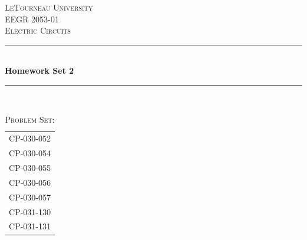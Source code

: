 \begin{titlepage}
\newcommand{\HRule}{\rule{\linewidth}{0.4mm}} %

\center %
 

\textsc{\LARGE LeTourneau University}\\[1.5cm] %
\textsc{\Large EEGR 2053-01}\\[0.5cm] %
\textsc{\large Electric Circuits}\\[0.5cm] %


\HRule \\[0.4cm]
{ \huge \bfseries Homework Set 2}\\[0.2cm] %
\HRule \\[1.5cm]
 

\begin{table}[h]
\large
\ttfamily
\centering
\caption*{\textsc{\large Problem Set:}}
\label{tab:probset}
\begin{tabular}{l}
CP-030-052 \\
CP-030-054 \\
CP-030-055 \\
CP-030-056 \\
CP-030-057 \\
CP-031-130 \\
CP-031-131 \\[1.5cm]
\end{tabular}
\end{table}



\end{titlepage}
